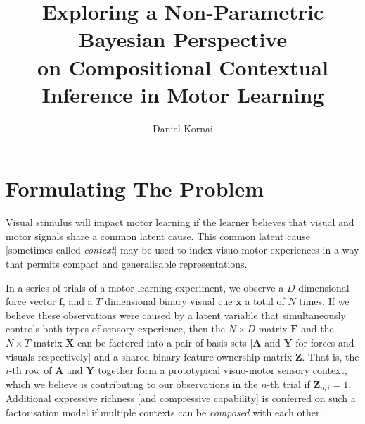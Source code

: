 \documentclass[]{article}
\title{Exploring a Non-Parametric Bayesian Perspective\\ on Compositional Contextual Inference in Motor Learning}
\author{Daniel Kornai}
\begin{document}
\maketitle


\section{Formulating The Problem}
Visual stimulus will impact motor learning if the learner believes that visual and motor signals share a common latent cause. This common latent cause [sometimes called \textit{context}] may be used to index visuo-motor experiences in a way that permits compact and generalisable representations.

In a series of trials of a motor learning experiment, we observe a $D$ dimensional force vector $\mathbf{f}$, and a $T$ dimensional binary visual cue $\mathbf{x}$ a total of $N$ times. If we believe these observations were caused by a latent variable that simultaneously controls both types of sensory experience, then the $N \times D$ matrix $\mathbf{F}$ and the $N \times T$ matrix $\mathbf{X}$ can be factored into a pair of basis sets [$\mathbf{A}$ and $\mathbf{Y}$ for forces and visuals respectively] and a shared binary feature ownership matrix $\mathbf{Z}$. That is, the $i$-th row of $\mathbf{A}$ and $\mathbf{Y}$ together form a prototypical visuo-motor sensory context, which we believe is contributing to our observations in the $n$-th trial if $\mathbf{Z}_{n,i} = 1$. Additional expressive richness [and compressive capability] is conferred on such a factorisation model if multiple contexts can be \textit{composed} with each other.
\end{document}
